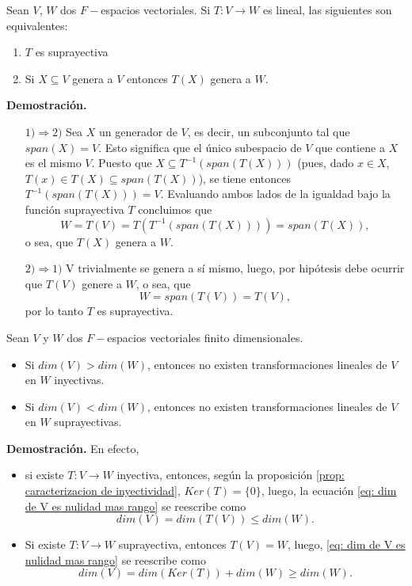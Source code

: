 \QEDB
\vspace{0.2cm}

\begin{prop}
Sean $V$, $W$ dos $F-$espacios vectoriales. Si $T: V \longrightarrow W$
es lineal, las siguientes son equivalentes:
\begin{enumerate}
	\item $T$ es suprayectiva
	\item Si $X \subseteq V$ genera a $V$ entonces $T(X)$
	genera a $W$.
\end{enumerate}
\end{prop}
\noindent
\textbf{Demostración.}
\begin{itemize}
	\item[$1) \Rightarrow 2)$] Sea $X$ un generador de $V$,
	es decir, un subconjunto tal que $span(X) = V$.
	Esto significa que el único subespacio de $V$ que contiene a 
	$X$ es el mismo $V$. Puesto que
	$X \subseteq T^{-1}(span(T(X)))$
	(pues, dado $x \in X$, $T(x) \in T(X) \subseteq 
	span(T(X))$), se tiene entonces
	$T^{-1}( span(T(X)) ) = V$. Evaluando ambos lados
	de la igualdad bajo la función suprayectiva $T$ concluimos que
	\[
	W = T(V) = T(T^{-1}( span(T(X))  )) =  span(T(X)),
	\]
	o sea, que $T(X)$ genera a $W$.
	\item[$2) \Rightarrow 1)$] V trivialmente se genera a sí mismo,
	luego, por hipótesis debe ocurrir que $T(V)$ genere a $W$, o sea,
	que 
	\[
	W = span(T(V)) = T(V),
	\]
	por lo tanto $T$ es suprayectiva.
\end{itemize}

\QEDB
\vspace{0.2cm}

\begin{prop}
Sean $V$ y $W$ dos $F-$espacios vectoriales finito dimensionales.
\begin{itemize}
	\item Si $dim(V) > dim(W)$, entonces no existen transformaciones
	lineales de $V$ en $W$ inyectivas.
	\item Si $dim(V) < dim(W)$, entonces no existen transformaciones
	lineales de $V$ en $W$ suprayectivas.
\end{itemize}
\end{prop}
\noindent
\textbf{Demostración.}
En efecto, 
\begin{itemize}
	\item si existe $T: V \longrightarrow W$ inyectiva, entonces,
	según la proposición \ref{prop: caracterizacion de inyectividad},
	$Ker(T) = \{ 0 \}$, luego, la ecuación
	\eqref{eq: dim de V es nulidad mas rango} se reescribe como
	\[
	dim(V) = dim(T(V)) \leq dim(W).
	\]
	\item Si existe $T: V \longrightarrow W$ suprayectiva,
	entonces $T(V)= W$, luego, 
	\eqref{eq: dim de V es nulidad mas rango} se reescribe como
	\[
	dim(V) = dim(Ker(T)) + dim(W) \geq dim(W).
	\]
\end{itemize}
\QEDB
\vspace{0.2cm}

